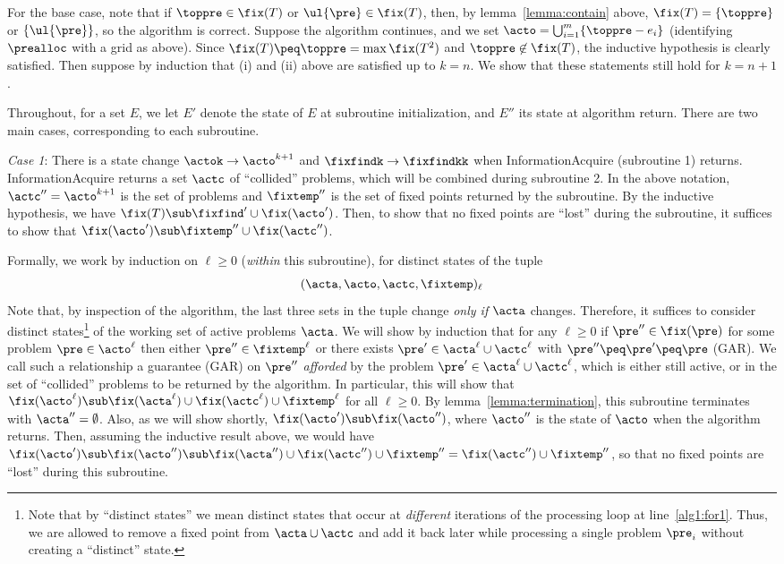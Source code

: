 For the base case, note that if $\toppre \in \fix(T)$ or $\ul{\pre} \in \fix(T)$, then, by lemma~\ref{lemma:contain} above, $\fix(T) = \{\toppre\}$ or $\{\ul{\pre}\}$, so the algorithm is correct. 
Suppose the algorithm continues, and we set $\acto = \bigcup_{i = 1}^m \{\toppre - e_i\}$ (identifying $\prealloc$ with a grid as above).
Since $\fix(T) \peq \toppre = \max \fix(T^2)$ and $\toppre \not \in \fix(T)$, the inductive hypothesis is clearly satisfied. 
Then suppose by induction that (i) and (ii) above are satisfied up to $k = n$.
We show that these statements still hold for $k = n +1$.

Throughout, for a set $E$, we let $E'$ denote the state of $E$ at subroutine initialization, and $E''$ its state at algorithm return.
There are two main cases, corresponding to each subroutine.

\emph{Case 1}: There is a state change $\actok \to \acto^{k +1}$ and $\fixfindk \to \fixfindkk$ when InformationAcquire (subroutine 1) returns.
InformationAcquire returns a set $\actc$ of ``collided'' problems, which will be combined during subroutine 2.
In the above notation, $\actc'' = \acto^{k+1}$ is the set of problems and $\fixtemp''$ is the set of fixed points returned by the subroutine.
By the inductive hypothesis, we have $\fix(T) \sub \fixfind' \cup \fix(\acto')$.
Then, to show that no fixed points are ``lost'' during the subroutine, it suffices to show that $\fix(\acto') \sub \fixtemp'' \cup \fix(\actc'')$.

Formally, we work by induction on $\ell \geq 0$ (\emph{within} this subroutine), for distinct states of the tuple \[(\acta,\acto,\actc,\fixtemp)_{\ell}\]
Note that, by inspection of the algorithm, the last three sets in the tuple change \emph{only if} $\acta$ changes. 
Therefore, it suffices to consider distinct states\footnote{Note that by ``distinct states'' we mean distinct states that occur at \emph{different} iterations of the processing loop at line~\ref{alg1:for1}.
Thus, we are allowed to remove a fixed point from $\acta \cup \actc$ and add it back later while processing a single problem $\pre_i$ without creating a ``distinct'' state.} of the working set of active problems $\acta$.
We will show by induction that for any $\ell \geq 0$ if $\pre'' \in \fix(\pre)$ for some problem $\pre \in \acto^{\ell}$ then either $\pre'' \in \fixtemp^{\ell}$ or there exists $\pre' \in \acta^{\ell} \cup \actc^{\ell}$ with $\pre'' \peq \pre' \peq \pre$ (GAR).
We call such a relationship a guarantee (GAR) on $\pre''$ \emph{afforded} by the problem $\pre' \in \acta^{\ell} \cup \actc^{\ell}$, which is either still active, or in the set of ``collided'' problems to be returned by the algorithm.
In particular, this will show that $\fix(\acto^{\ell}) \sub \fix(\acta^{\ell}) \cup \fix(\actc^{\ell}) \cup \fixtemp^{\ell}$ for all $\ell \geq 0$.
By lemma~\ref{lemma:termination}, this subroutine terminates with $\acta'' = \emptyset$. 
Also, as we will show shortly, $\fix(\acto') \sub \fix(\acto'')$, where $\acto''$ is the state of $\acto$ when the algorithm returns. 
Then, assuming the inductive result above, we would have $\fix(\acto') \sub \fix(\acto'') \sub \fix(\acta'') \cup \fix(\actc'') \cup \fixtemp'' = \fix(\actc'') \cup \fixtemp''$, so that no fixed points are ``lost'' during this subroutine.

